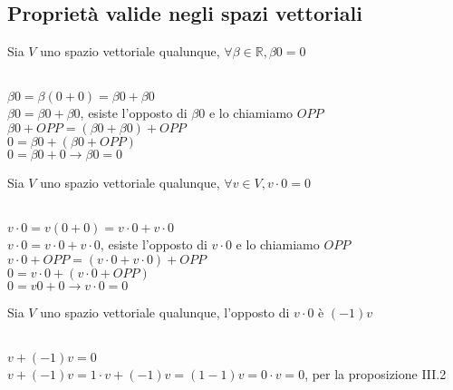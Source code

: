 \subsection{Proprietà valide negli spazi vettoriali}

\begin{proposizione}
	Sia $V$ uno spazio vettoriale qualunque, $\forall\beta\in\mathbb{R}, \beta 0=0$\\
    \begin{dimostrazione}
    	\phantom{}\\
    	$\beta 0=\beta(0+0)=\beta 0+\beta 0$\\
    	$\beta 0=\beta 0+\beta 0$, esiste l'opposto di $\beta 0$ e lo chiamiamo $OPP$\\
    	$\beta 0+ OPP=(\beta 0+\beta 0)+OPP$\\
    	$0=\beta 0+(\beta 0+OPP)$\\
    	$0=\beta 0+0\rightarrow \beta 0=0$
    \end{dimostrazione}
\end{proposizione}

\begin{proposizione}
	Sia $V$ uno spazio vettoriale qualunque, $\forall v\in V, v\cdot0=0$\\
	\begin{dimostrazione}
		\phantom{}\\
		$v\cdot0=v(0+0)=v\cdot0+v\cdot0$\\
		$v\cdot0=v\cdot0+v\cdot0$, esiste l'opposto di $v\cdot0$ e lo chiamiamo $OPP$\\
		$v\cdot0+ OPP=(v\cdot0+v\cdot0)+OPP$\\
		$0=v\cdot0+(v\cdot0+OPP)$\\
		$0=v 0+0\rightarrow v\cdot0=0$
	\end{dimostrazione}
\end{proposizione}

\begin{proposizione}
	Sia $V$ uno spazio vettoriale qualunque, l'opposto di $v\cdot0$ è $(-1)v$\\
	\begin{dimostrazione}
		\phantom{}\\
		$v+(-1)v=0$\\
		$v+(-1)v=1\cdot v+(-1)v=(1-1)v=0\cdot v=0$, per la proposizione III.2
	\end{dimostrazione}
\end{proposizione}


